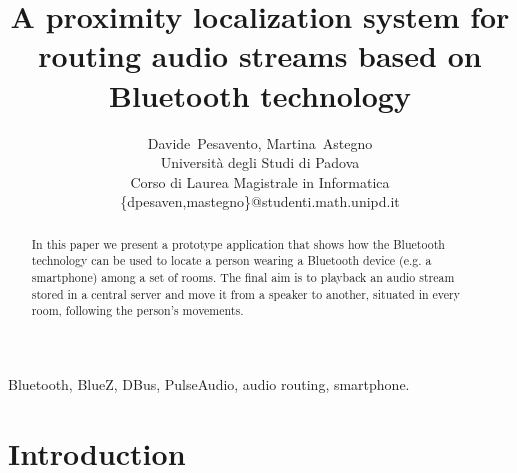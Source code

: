 \documentclass[conference]{IEEEtran}
\begin{document}
\title{A proximity localization system for routing audio streams based on Bluetooth technology}
\author{Davide~Pesavento, Martina~Astegno \\
	Università degli Studi di Padova \\
	Corso di Laurea Magistrale in Informatica \\
	\{dpesaven,mastegno\}@studenti.math.unipd.it
}

\maketitle

\begin{abstract}
In this paper we present a prototype application that shows how the Bluetooth technology can be used to locate a person wearing a Bluetooth device (e.g. a smartphone) among a set of rooms. The final aim is to playback an audio stream stored in a central server and move it from a speaker to another, situated in every room, following the person's movements.
\end{abstract}

\begin{IEEEkeywords} %
Bluetooth, BlueZ, DBus, PulseAudio, audio routing, smartphone.
\end{IEEEkeywords}

\IEEEpeerreviewmaketitle

\section{Introduction}
\end{document}
